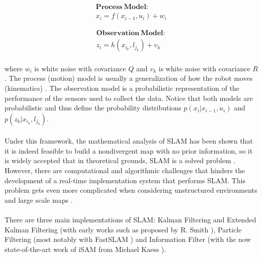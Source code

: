 \documentclass[11pt]{article}
\begin{document}
	\begin{minipage}{.48\linewidth}
		\centering
		\begin{equation*}
		\begin{split}
		\mathbf{Process\ Model:} \\ 
		x_i = f(x_{i-1}, u_i) + w_i
		\end{split}
		\end{equation*}
	\end{minipage}
	\begin{minipage}{.48\linewidth}
		\centering
		\begin{equation*}
		\begin{split}
		\mathbf{Observation\ Model:} \\ 
		z_i = h(x_{i_k}, l_{j_k}) + v_k
		\end{split}
		\end{equation*}
	\end{minipage}
	
	\paragraph{}
	where $w_i$ is white noise with covariance $Q$ and $v_k$ is white noise with covariance $R$. The process (motion) model is usually a generalization of how the robot moves (kinematics) \cite{Montemerlo02fastslam:a}\cite{772544}. The observation model is a probabilistic representation of the performance of the sensors used to collect the data. Notice that both models are probabilistic and thus define the probability distributions $p(x_i|x_{i-1},u_i)$ and $p(z_k|x_{i_k},l_{j_k})$.

	\paragraph{}
	Under this framework, the mathematical analysis of SLAM has been shown that it is indeed feasible to build a nondivergent map with no prior information, so it is widely accepted that in theoretical grounds, SLAM is a solved problem \cite{SLAMPartI}\cite{Cadena}\cite{CsorbaThesis}\cite{938381}. However, there are computational and algorithmic challenges that hinders the development of a real-time implementation system that performs SLAM. This problem gets even more complicated when considering unstructured environments and large scale maps \cite{SLAMPartII}.
	
	\paragraph{}
	There are three main implementations of SLAM: Kalman Filtering and Extended Kalman Filtering (with early works such as proposed by R. Smith \cite{Smith:1990:EUS:93002.93291}), Particle Filtering (most notably with FastSLAM \cite{Montemerlo02fastslam:a}) and Information Filter (with the now state-of-the-art work of iSAM from Michael Kaess \cite{Kaess08tro}).
\end{document}

